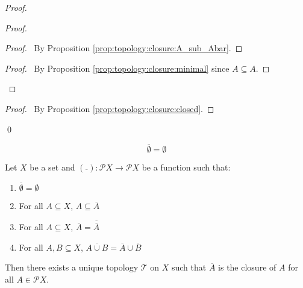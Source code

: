 \begin{proof}
  \pf
  \begin{proof}
    \begin{proof}
      \pf\ By Proposition \ref{prop:topology:closure:A_sub_Abar}.
    \end{proof}
    \begin{proof}
      \pf\ By Proposition \ref{prop:topology:closure:minimal} since $A
      \subseteq A$.
    \end{proof}
  \end{proof}
  \begin{proof}
    \pf\ By Proposition \ref{prop:topology:closure:closed}.
  \end{proof}
  \qed
\end{proof}

\begin{cor}
  \[ \overline{\emptyset} = \emptyset \]
\end{cor}

\begin{thm}
  Let $X$ be a set and $(\overline{\ }) : \mathcal{P} X \rightarrow
  \mathcal{P} X$ be a function such that:
  \begin{enumerate}
    \item $\overline{\emptyset} = \emptyset$
    \item For all $A \subseteq X$, $A \subseteq \overline{A}$
    \item For all $A \subseteq X$, $\overline{A} = \overline{\overline{A}}$
    \item For all $A, B \subseteq X$, $\overline{A \cup B} = \overline{A}
    \cup
    \overline{B}$
  \end{enumerate}
  Then there exists a unique topology $\mathcal{T}$ on $X$ such that
  $\overline{A}$ is the closure of $A$ for all $A \in \mathcal{P} X$.
\end{thm}

